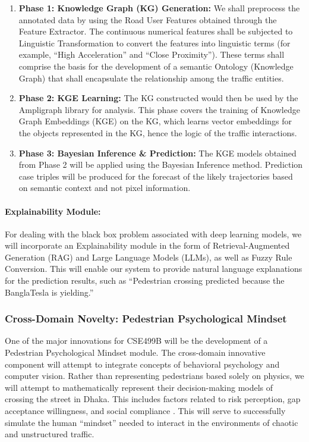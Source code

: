 \documentclass[12pt, a4paper]{article}
\begin{document}
\begin{enumerate}
    \item \textbf{Phase 1: Knowledge Graph (KG) Generation:} We shall preprocess the annotated data by using the Road User Features obtained through the Feature Extractor. The continuous numerical features shall be subjected to Linguistic Transformation to convert the features into linguistic terms (for example, ``High Acceleration'' and ``Close Proximity''). These terms shall comprise the basis for the development of a semantic Ontology (Knowledge Graph) that shall encapsulate the relationship among the traffic entities.
    
    \item \textbf{Phase 2: KGE Learning:} The KG constructed would then be used by the Ampligraph library for analysis. This phase covers the training of Knowledge Graph Embeddings (KGE) on the KG, which learns vector embeddings for the objects represented in the KG, hence the logic of the traffic interactions.
    
    \item \textbf{Phase 3: Bayesian Inference \& Prediction:} The KGE models obtained from Phase 2 will be applied using the Bayesian Inference method. Prediction case triples will be produced for the forecast of the likely trajectories based on semantic context and not pixel information.
\end{enumerate}

\paragraph{Explainability Module:} For dealing with the black box problem associated with deep learning models, we will incorporate an Explainability module in the form of Retrieval-Augmented Generation (RAG) and Large Language Models (LLMs), as well as Fuzzy Rule Conversion. This will enable our system to provide natural language explanations for the prediction results, such as ``Pedestrian crossing predicted because the BanglaTesla is yielding.''

\subsubsection{Cross-Domain Novelty: Pedestrian Psychological Mindset}
One of the major innovations for CSE499B will be the development of a Pedestrian Psychological Mindset module. The cross-domain innovative component will attempt to integrate concepts of behavioral psychology and computer vision. Rather than representing pedestrians based solely on physics, we will attempt to mathematically represent their decision-making models of crossing the street in Dhaka. This includes factors related to risk perception, gap acceptance willingness, and social compliance \cite{vasudevan2020pedestrian}. This will serve to successfully simulate the human ``mindset'' needed to interact in the environments of chaotic and unstructured traffic.
\end{document}
